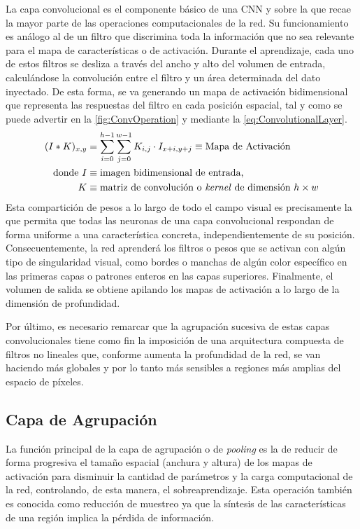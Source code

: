 La capa convolucional es el componente básico de una CNN y sobre la que recae la mayor parte de las operaciones computacionales de la red. Su funcionamiento es análogo al de un filtro que discrimina toda la información que no sea relevante para el mapa de características o de activación. Durante el aprendizaje, cada uno de estos filtros se desliza a través del ancho y alto del volumen de entrada, calculándose la convolución entre el filtro y un área determinada del dato inyectado. De esta forma, se va generando un mapa de activación bidimensional que representa las respuestas del filtro en cada posición espacial, tal y como se puede advertir en la \autoref{fig:ConvOperation} y mediante la \autoref{eq:ConvolutionalLayer}.
\begin{align} \label{eq:ConvolutionalLayer}
    (I \ast K)_{x,y} &= \sum\limits_{i=0}^{h -1} \sum\limits_{j=0}^{w-1} K_{i,j} \cdot I_{x+i, y+j} \equiv \text{Mapa de Activación} \\
    \text{donde}~ 
    I &\equiv \text{imagen bidimensional de entrada,} \notag \\
    K &\equiv \text{matriz de convolución o \textit{kernel} de dimensión $h\times w$} \notag
\end{align}
Esta compartición de pesos a lo largo de todo el campo visual es precisamente la que permita que todas las neuronas de una capa convolucional respondan de forma uniforme a una característica concreta, independientemente de su posición. Consecuentemente, la red aprenderá los filtros o pesos que se activan con algún tipo de singularidad visual, como bordes o manchas de algún color específico en las primeras capas o patrones enteros en las capas superiores. Finalmente, el volumen de salida se obtiene apilando los mapas de activación a lo largo de la dimensión de profundidad.

Por último, es necesario remarcar que la agrupación sucesiva de estas capas convolucionales tiene como fin la imposición de una arquitectura compuesta de filtros no lineales que, conforme aumenta la profundidad de la red, se van haciendo más globales y por lo tanto más sensibles a regiones más amplias del espacio de píxeles.

\subsection{Capa de Agrupación}

La función principal de la capa de agrupación o de \textit{pooling} es la de reducir de forma progresiva el tamaño espacial (anchura y altura) de los mapas de activación para disminuir la cantidad de parámetros y la carga computacional de la red, controlando, de esta manera, el sobreaprendizaje. Esta operación también es conocida como reducción de muestreo ya que la síntesis de las características de una región implica la pérdida de información.

